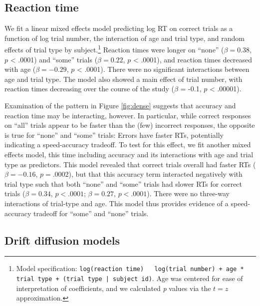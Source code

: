 \documentclass[10pt, letterpaper]{article}
\begin{document}
\subsection{Reaction time}\label{reaction-time}

We fit a linear mixed effects model predicting log RT on correct trials
as a function of log trial number, the interaction of age and trial
type, and random effects of trial type by subject.\footnote{Model
  specification:
  \texttt{log(reaction time) ~ log(trial number) + age * trial type + (trial type | subject id)}.
  Age was centered for ease of interpretation of coefficients, and we
  calculated \emph{p} values via the \(t=z\) approximation.} Reaction
times were longer on ``none'' (\(\beta = 0.38\), \(p\) \textless{}
.0001) and ``some'' trials (\(\beta = 0.22\), \(p\) \textless{} .0001),
and reaction times decreased with age (\(\beta = -0.29\), \(p\)
\textless{} .0001). There were no significant interactions between age
and trial type. The model also showed a main effect of trial number,
with reaction times decreasing over the course of the study (\(\beta\) =
-0.1, \(p\) \textless{} .00001).

Examination of the pattern in Figure \ref{fig:dense} suggests that
accuracy and reaction time may be interacting, however. In particular,
while correct responses on ``all'' trials appear to be faster than the
(few) incorrect responses, the opposite is true for ``none'' and
``some'' trials: Errors have faster RTs, potentially indicating a
speed-accuracy tradeoff. To test for this effect, we fit another mixed
effects model, this time including accuracy and its interactions with
age and trial type as predictors. This model revealed that correct
trials overall had faster RTs (\(\beta = -0.16\), \(p = .0002\)), but
that this accuracy term interacted negatively with trial type such that
both ``none'' and ``some'' trials had slower RTs for correct trials
(\(\beta = 0.34\), \(p < .0001\); \(\beta = 0.27\), \(p < .0001\)).
There were no three-way interactions of trial-type and age. This model
thus provides evidence of a speed-accuracy tradeoff for ``some'' and
``none'' trials.

\subsection{Drift diffusion models}\label{drift-diffusion-models}
\end{document}
